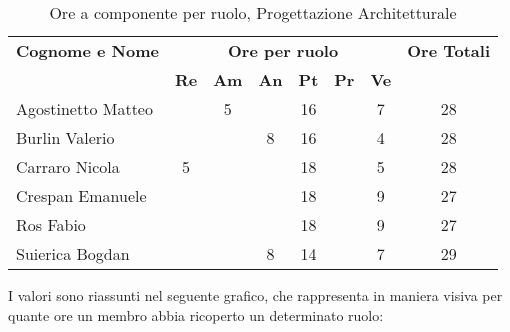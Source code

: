 \begin{table}[h]
	\centering
	\begin{tabular}{|l|c|c|c|c|c|c|c|}
		\toprule
		\textbf{Cognome e Nome} & \multicolumn{6}{c}{\textbf{Ore per ruolo}} & \textbf{Ore Totali} \\
		& \textbf{Re} & \textbf{Am} & \textbf{An} & \textbf{Pt} & \textbf{Pr} & \textbf{Ve} & \\
		
		\midrule
		Agostinetto Matteo & & 5 & & 16 & & 7 & 28 \\
		Burlin Valerio & & & 8 & 16 & & 4 & 28 \\ 
		Carraro Nicola & 5 & & & 18 & & 5 & 28 \\
		Crespan Emanuele & & & & 18 & & 9 & 27 \\
		Ros Fabio & & & & 18 & & 9 & 27 \\
		Suierica Bogdan & & & 8 & 14 & & 7 & 29 \\
		
		\bottomrule
	\end{tabular}
	\caption{Ore a componente per ruolo, Progettazione Architetturale}
\end{table}

\noindent I valori sono riassunti nel seguente grafico, che rappresenta in maniera visiva per quante ore un membro abbia ricoperto un determinato ruolo:

